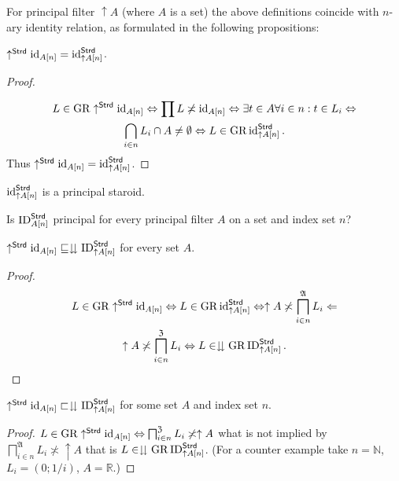 For principal filter $\uparrow A$ (where $A$ is a set) the above
definitions coincide with $n$-ary identity relation, as formulated
in the following propositions:
\begin{prop}
$\uparrow^{\mathsf{Strd}}\operatorname{id}_{A[n]}=\operatorname{id}_{\uparrow A[n]}^{\mathsf{Strd}}$.\end{prop}
\begin{proof}
~

\begin{multline*}
L\in\operatorname{GR}\uparrow^{\mathsf{Strd}}\operatorname{id}_{A[n]}\Leftrightarrow\prod L\not\asymp\operatorname{id}_{A[n]}\Leftrightarrow\exists t\in A\forall i\in n:t\in L_{i}\Leftrightarrow\\
\bigcap_{i\in n}L_{i}\cap A\neq\emptyset\Leftrightarrow L\in\operatorname{GR}\operatorname{id}_{\uparrow A[n]}^{\mathsf{Strd}}.
\end{multline*}
Thus $\uparrow^{\mathsf{Strd}}\operatorname{id}_{A[n]}=\operatorname{id}_{\uparrow A[n]}^{\mathsf{Strd}}$.\end{proof}
\begin{cor}
$\operatorname{id}_{\uparrow A[n]}^{\mathsf{Strd}}$ is a principal staroid.\end{cor}
\begin{question}
Is $\operatorname{ID}_{A[n]}^{\mathsf{Strd}}$ principal for every principal filter
$A$ on a set and index set $n$?\end{question}
\begin{prop}
$\uparrow^{\mathsf{Strd}}\operatorname{id}_{A[n]}\sqsubseteq\downdownarrows\operatorname{ID}_{\uparrow A[n]}^{\mathsf{Strd}}$
for every set $A$.\end{prop}
\begin{proof}
~
\begin{multline*}
L\in\operatorname{GR}\uparrow^{\mathsf{Strd}}\operatorname{id}_{A[n]}\Leftrightarrow L\in\operatorname{GR}\operatorname{id}_{\uparrow A[n]}^{\mathsf{Strd}}\Leftrightarrow\uparrow A\not\asymp\bigsqcap_{i\in n}^{\mathfrak{A}}L_{i}\Leftarrow\\
\uparrow A\not\asymp\bigsqcap_{i\in n}^{\mathfrak{Z}}L_{i}\Leftrightarrow L\in\downdownarrows\operatorname{GR}\operatorname{ID}_{\uparrow A[n]}^{\mathsf{Strd}}.
\end{multline*}
\end{proof}
\begin{prop}
$\uparrow^{\mathsf{Strd}}\operatorname{id}_{A[n]}\sqsubset\downdownarrows\operatorname{ID}_{\uparrow A[n]}^{\mathsf{Strd}}$
for some set $A$ and index set $n$.\end{prop}
\begin{proof}
$L\in\operatorname{GR}\uparrow^{\mathsf{Strd}}\operatorname{id}_{A[n]}\Leftrightarrow\bigsqcap_{i\in n}^{\mathfrak{Z}}L_{i}\not\asymp\uparrow A$
what is not implied by $\bigsqcap_{i\in n}^{\mathfrak{A}}L_{i}\nasymp\uparrow A$
that is $L\in\downdownarrows\operatorname{GR}\operatorname{ID}_{\uparrow A[n]}^{\mathsf{Strd}}$.
(For a counter example take $n=\mathbb{N}$, $L_{i}=(0;1/i)$, $A=\mathbb{R}$.)\end{proof}
